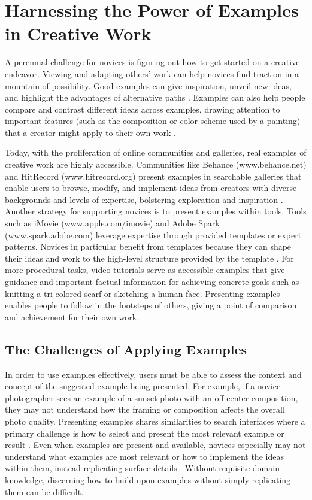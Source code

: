 \section{Harnessing the Power of Examples in Creative Work}

A perennial challenge for novices is figuring out how to get started on a creative endeavor. Viewing and adapting others' work can help novices find traction in a mountain of possibility. Good examples can give inspiration, unveil new ideas, and highlight the advantages of alternative paths \cite{chan2011benefits,Siangliulue}. Examples can also help people compare and contrast different ideas across examples, drawing attention to important features (such as the composition or color scheme used by a painting) that a creator might apply to their own work \cite{alfieri2013learning,chi2012seeing,gentner2003learning,kulkarni2012early,marsh1996examples}. 

Today, with the proliferation of online communities and galleries, real examples of creative work are highly accessible.
Communities like Behance (www.behance.net) and HitRecord (www.hitrecord.org) present examples in searchable galleries that enable users to browse, modify, and implement ideas from creators with diverse backgrounds and levels of expertise, bolstering exploration and inspiration \cite{kang2018paragon,Lee2009,Lee2010}. Another strategy for supporting novices is to present examples within tools. Tools such as iMovie (www.apple.com/imovie) and Adobe Spark (www.spark.adobe.com) leverage expertise through provided templates or expert patterns. Novices in particular benefit from templates because they can shape their ideas and work to the high-level structure provided by the template \cite{Kim, kumar2011, yuan2016}.
For more procedural tasks, video tutorials serve as accessible examples that give guidance and important factual information for achieving concrete goals \cite{van2003} such as knitting a tri-colored scarf or sketching a human face. Presenting examples enables people to follow in the footsteps of others, giving a point of comparison and achievement for their own work.

\subsection{The Challenges of Applying Examples}
In order to use examples effectively, users must be able to assess the context and concept of the suggested example being presented. For example, if a novice photographer sees an example of a sunset photo with an off-center composition, they may not understand how the framing or composition affects the overall photo quality.  
Presenting examples shares similarities to search interfaces where a primary challenge is how to select and present the most relevant example or result \cite{hearst2009search,matejka2011ambient}. 
Even when examples are present and available, novices especially may not understand what examples are most relevant or how to implement the ideas within them, instead replicating surface details \cite{javadi2012impact}. Without requisite domain knowledge, discerning how to build upon examples without simply replicating them can be difficult.  

